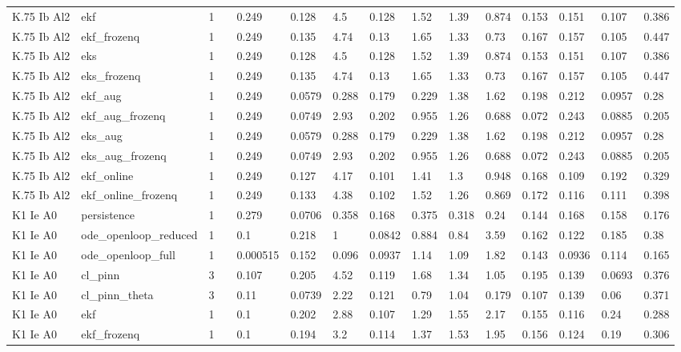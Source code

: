 \begin{table}[t]
\begin{tabular}{lllllllllllllll}
K.75 Ib Al2 & ekf & 1 &  & 0.249 & 0.128 & 4.5 & 0.128 & 1.52 & 1.39 & 0.874 & 0.153 & 0.151 & 0.107 & 0.386 \\
K.75 Ib Al2 & ekf\_frozenq & 1 &  & 0.249 & 0.135 & 4.74 & 0.13 & 1.65 & 1.33 & 0.73 & 0.167 & 0.157 & 0.105 & 0.447 \\
K.75 Ib Al2 & eks & 1 &  & 0.249 & 0.128 & 4.5 & 0.128 & 1.52 & 1.39 & 0.874 & 0.153 & 0.151 & 0.107 & 0.386 \\
K.75 Ib Al2 & eks\_frozenq & 1 &  & 0.249 & 0.135 & 4.74 & 0.13 & 1.65 & 1.33 & 0.73 & 0.167 & 0.157 & 0.105 & 0.447 \\
K.75 Ib Al2 & ekf\_aug & 1 &  & 0.249 & 0.0579 & 0.288 & 0.179 & 0.229 & 1.38 & 1.62 & 0.198 & 0.212 & 0.0957 & 0.28 \\
K.75 Ib Al2 & ekf\_aug\_frozenq & 1 &  & 0.249 & 0.0749 & 2.93 & 0.202 & 0.955 & 1.26 & 0.688 & 0.072 & 0.243 & 0.0885 & 0.205 \\
K.75 Ib Al2 & eks\_aug & 1 &  & 0.249 & 0.0579 & 0.288 & 0.179 & 0.229 & 1.38 & 1.62 & 0.198 & 0.212 & 0.0957 & 0.28 \\
K.75 Ib Al2 & eks\_aug\_frozenq & 1 &  & 0.249 & 0.0749 & 2.93 & 0.202 & 0.955 & 1.26 & 0.688 & 0.072 & 0.243 & 0.0885 & 0.205 \\
K.75 Ib Al2 & ekf\_online & 1 &  & 0.249 & 0.127 & 4.17 & 0.101 & 1.41 & 1.3 & 0.948 & 0.168 & 0.109 & 0.192 & 0.329 \\
K.75 Ib Al2 & ekf\_online\_frozenq & 1 &  & 0.249 & 0.133 & 4.38 & 0.102 & 1.52 & 1.26 & 0.869 & 0.172 & 0.116 & 0.111 & 0.398 \\
K1 Ie A0 & persistence & 1 &  & 0.279 & 0.0706 & 0.358 & 0.168 & 0.375 & 0.318 & 0.24 & 0.144 & 0.168 & 0.158 & 0.176 \\
K1 Ie A0 & ode\_openloop\_reduced & 1 &  & 0.1 & 0.218 & 1 & 0.0842 & 0.884 & 0.84 & 3.59 & 0.162 & 0.122 & 0.185 & 0.38 \\
K1 Ie A0 & ode\_openloop\_full & 1 &  & 0.000515 & 0.152 & 0.096 & 0.0937 & 1.14 & 1.09 & 1.82 & 0.143 & 0.0936 & 0.114 & 0.165 \\
K1 Ie A0 & cl\_pinn & 3 &  & 0.107 & 0.205 & 4.52 & 0.119 & 1.68 & 1.34 & 1.05 & 0.195 & 0.139 & 0.0693 & 0.376 \\
K1 Ie A0 & cl\_pinn\_theta & 3 &  & 0.11 & 0.0739 & 2.22 & 0.121 & 0.79 & 1.04 & 0.179 & 0.107 & 0.139 & 0.06 & 0.371 \\
K1 Ie A0 & ekf & 1 &  & 0.1 & 0.202 & 2.88 & 0.107 & 1.29 & 1.55 & 2.17 & 0.155 & 0.116 & 0.24 & 0.288 \\
K1 Ie A0 & ekf\_frozenq & 1 &  & 0.1 & 0.194 & 3.2 & 0.114 & 1.37 & 1.53 & 1.95 & 0.156 & 0.124 & 0.19 & 0.306 \\

\end{tabular}
\end{table}
